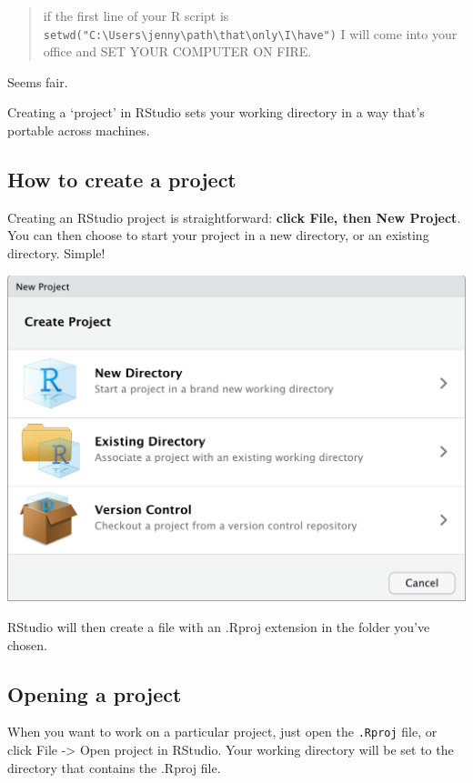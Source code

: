 \documentclass[
]{book}
\begin{document}
\begin{quote}
if the first line of your R script is \texttt{setwd("C:\textbackslash{}Users\textbackslash{}jenny\textbackslash{}path\textbackslash{}that\textbackslash{}only\textbackslash{}I\textbackslash{}have")} I will come into your office and SET YOUR COMPUTER ON FIRE.
\end{quote}

Seems fair.

Creating a `project' in RStudio sets your working directory in a way that's portable across machines.

\hypertarget{how-to-create-a-project}{%
\subsection{How to create a project}\label{how-to-create-a-project}}

Creating an RStudio project is straightforward: \textbf{click File, then New Project}. You can then choose to start your project in a new directory, or an existing directory. Simple!

\begin{center}\includegraphics[width=0.66\linewidth]{atlas/rstudio_newproject} \end{center}

RStudio will then create a file with an .Rproj extension in the folder you've chosen.

\hypertarget{opening-a-project}{%
\subsection{Opening a project}\label{opening-a-project}}

When you want to work on a particular project, just open the \texttt{.Rproj} file, or click File -\textgreater{} Open project in RStudio. Your working directory will be set to the directory that contains the .Rproj file.
\end{document}
